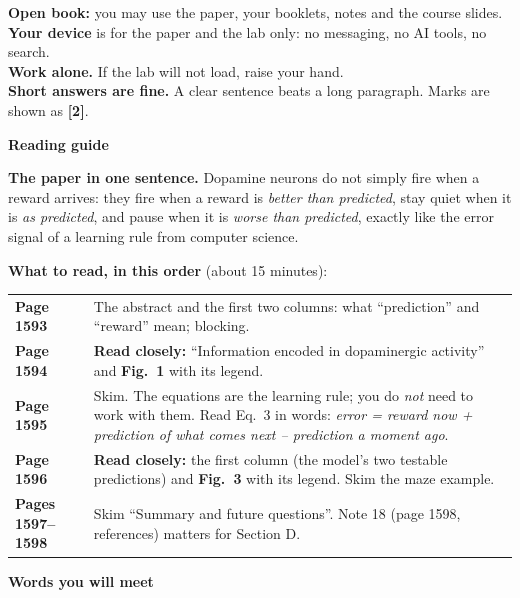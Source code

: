 \documentclass[12pt,a4paper]{article}
\newcommand{\pagehead}[1]{{\color{kprimary}\LARGE\bfseries #1}\par\vspace{2pt}{\color{kaccent}\rule{\linewidth}{1.2pt}}\par\vspace{4pt}}
\begin{document}
\medskip
\begin{stepsbox}[title={\bfseries Rules}]
\textbf{Open book:} you may use the paper, your booklets, notes and the course slides.\\[2pt]
\textbf{Your device} is for the paper and the lab only: no messaging, no AI tools, no search.\\[2pt]
\textbf{Work alone.} If the lab will not load, raise your hand.\\[2pt]
\textbf{Short answers are fine.} A clear sentence beats a long paragraph. Marks are shown as {\color{kaccent}\textbf{[2]}}.
\end{stepsbox}

\newpage
\pagehead{Reading guide}

\textbf{The paper in one sentence.} Dopamine neurons do not simply fire when a reward arrives: they fire when a reward is \emph{better than predicted}, stay quiet when it is \emph{as predicted}, and pause when it is \emph{worse than predicted}, exactly like the error signal of a learning rule from computer science.

\medskip
\textbf{What to read, in this order} (about 15 minutes):

{\renewcommand{\arraystretch}{1.3}
\begin{tabular}{@{}>{\bfseries}p{2.6cm}p{13.4cm}@{}}
\toprule
Page 1593 & The abstract and the first two columns: what ``prediction'' and ``reward'' mean; blocking.\\
Page 1594 & \textbf{Read closely:} ``Information encoded in dopaminergic activity'' and \textbf{Fig.~1} with its legend.\\
Page 1595 & Skim. The equations are the learning rule; you do \emph{not} need to work with them. Read Eq.~3 in words: \emph{error = reward now + prediction of what comes next -- prediction a moment ago}.\\
Page 1596 & \textbf{Read closely:} the first column (the model's two testable predictions) and \textbf{Fig.~3} with its legend. Skim the maze example.\\
Pages 1597--1598 & Skim ``Summary and future questions''. Note 18 (page 1598, references) matters for Section D.\\
\bottomrule
\end{tabular}}

\medskip
\textbf{Words you will meet}
\end{document}
